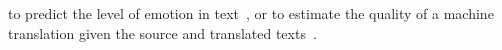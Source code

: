 to predict the level of emotion in text~\cite{beck2014joint},
or to estimate the quality of a machine translation given the source and translated texts~\cite{cohn2013modelling}.
%

